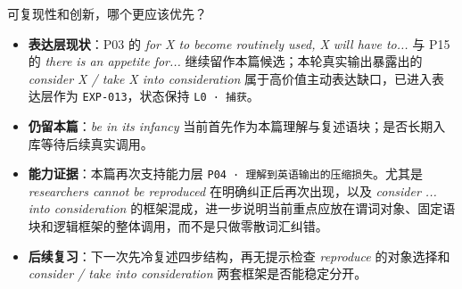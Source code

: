 \documentclass[11pt,a4paper]{ctexart}
\begin{document}
\begin{aiinteraction}{可复现性和创新，哪个更应该优先？}
  \aiuseranswer{}
  \ainatural{}
\end{aiinteraction}


\begin{itemize}
  \item \textbf{\color{readGreen}表达层现状}：P03 的 \textit{for X to become routinely used, X will have to...} 与 P15 的 \textit{there is an appetite for...} 继续留作本篇候选；本轮真实输出暴露出的 \textit{consider X / take X into consideration} 属于高价值主动表达缺口，已进入表达层作为 \texttt{EXP-013}，状态保持 \texttt{L0 · 捕获}。
  \item \textbf{\color{readMain}仍留本篇}：\textit{be in its infancy} 当前首先作为本篇理解与复述语块；是否长期入库等待后续真实调用。
  \item \textbf{\color{readGray}能力证据}：本篇再次支持能力层 \texttt{P04 · 理解到英语输出的压缩损失}。尤其是 \textit{researchers cannot be reproduced} 在明确纠正后再次出现，以及 \textit{consider ... into consideration} 的框架混成，进一步说明当前重点应放在谓词对象、固定语块和逻辑框架的整体调用，而不是只做零散词汇纠错。
  \item \textbf{\color{readGray}后续复习}：下一次先冷复述四步结构，再无提示检查 \textit{reproduce} 的对象选择和 \textit{consider / take into consideration} 两套框架是否能稳定分开。
\end{itemize}
\end{document}
